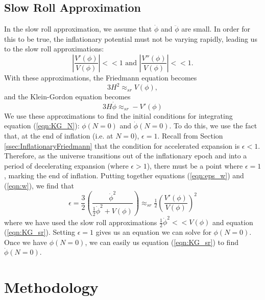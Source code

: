 \documentclass[a4paper,11pt]{article}
\def\half{\tfrac{1}{2}}
\begin{document}
\subsection{Slow Roll Approximation}
\label{sec:SlowRoll}
In the slow roll approximation, we assume that $\dot \phi$ and $\ddot \phi$ are small. In order for this to be true, the inflationary potential must not be varying rapidly, leading us to the slow roll approximations:
\begin{equation}
\left | \frac{V'(\phi)}{V(\phi)} \right | <<1 \text{\ \ \ and\ \ \ } \left | \frac{V''(\phi)}{V(\phi)} \right | <<1 .
\label{eqn:SlowRollApprox}
\end{equation}
With these approximations, the Friedmann equation becomes
\begin{equation}
3 H^2 \approx_{sr} V(\phi),
\label{eqn:Friedmann_sr}
\end{equation}
and the Klein-Gordon equation becomes
\begin{equation}
3 H \dot \phi \approx_{sr} -V'(\phi)
\label{eqn:KG_sr}
\end{equation}
We use these approximations to find the initial conditions for integrating equation (\ref{eqn:KG_N}): $\phi(N=0)$ and $\dot \phi(N=0)$. To do this, we use the fact that, at the end of inflation (i.e. at $N=0$), $\epsilon = 1$. Recall from Section \ref{ssec:InflationaryFriedmann} that the condition for accelerated expansion is $\epsilon<1$. Therefore, as the universe transitions out of the inflationary epoch and into a period of decelerating expansion (where $\epsilon>1$), there must be a point where $\epsilon=1$, marking the end of inflation. Putting together equations (\ref{eqn:eps_w}) and (\ref{eqn:w}), we find that 
\begin{equation}
\epsilon = \frac{3}{2} \left ( \frac{\dot \phi^2}{\half \dot \phi^2 + V(\phi)} \right ) \approx_{sr} \half \left (\frac{V'(\phi)}{V(\phi)} \right ) ^2 
\label{eqn:eps_sr}
\end{equation}
where we have used the slow roll approximations $\half \dot \phi^2 << V(\phi)$ and equation (\ref{eqn:KG_sr}). Setting $\epsilon=1$ gives us an equation we can solve for $\phi(N=0)$. Once we have $\phi(N=0)$, we can easily us equation (\ref{eqn:KG_sr}) to find $\dot \phi(N=0)$. 

\newpage
\section{Methodology}
\label{sec:methods}
\end{document}
